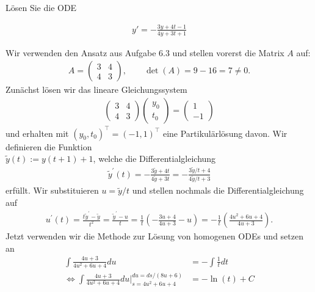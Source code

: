 \begin{exercise}
  Lösen Sie die ODE

  \begin{align*}
    y'= -\frac{3y + 4t - 1}{4y + 3t + 1}
  \end{align*}
\end{exercise}
\begin{solution}
Wir verwenden den Ansatz aus Aufgabe 6.3 und stellen vorerst die Matrix $A$ auf:
\begin{align*}
  A = \begin{pmatrix}
    3 & 4 \\ 4 & 3
  \end{pmatrix}, \qquad \det (A) = 9 - 16 = 7 \neq 0.
\end{align*}
Zunächst lösen wir das lineare Gleichungssystem
\begin{align*}
\begin{pmatrix}
 3 & 4 \\ 4 & 3
\end{pmatrix}
\begin{pmatrix}
  y_0 \\ t_0
\end{pmatrix}
=
\begin{pmatrix}
  1 \\ -1
\end{pmatrix}
\end{align*}
und erhalten mit $(y_0, t_0)^{\top} = (-1,1)^{\top}$ eine Partikulärlösung davon.
Wir definieren die Funktion \\
$\widetilde{y}(t) := y(t + 1) + 1$, welche die Differentialgleichung
\begin{align*}
  \widetilde{y}^{\prime}(t) = -\frac{3\widetilde{y} + 4t}{4\widetilde{y} + 3t}
  = -\frac{3\widetilde{y}/t + 4}{4\widetilde{y}/t + 3}
\end{align*}
erfüllt. Wir substituieren $u = \widetilde{y}/t$ und stellen nochmals die Differentialgleichung auf
\begin{align*}
  u^{\prime}(t) = \frac{t\widetilde{y}^{\prime} - \widetilde{y}}{t^2}
  = \frac{\widetilde{y}^{\prime} - u}{t}
  = \frac{1}{t}\left(-\frac{3u + 4}{4u + 3} -u\right)
  = -\frac{1}{t}\left(\frac{4u^2 + 6u + 4}{4u + 3}\right).
\end{align*}
Jetzt verwenden wir die Methode zur Lösung von homogenen ODEs und setzen an
\begin{align*}
  \int \frac{4u + 3}{4u^2 + 6u + 4} du &= -\int \frac{1}{t} dt \\
  \iff \int \frac{4u + 3}{4u^2 + 6u + 4} du \bigg|_{s = 4u^2 + 6u + 4}^{du = ds/(8u + 6)} &= -\ln(t) + C \\

\end{align*}
\end{solution}

